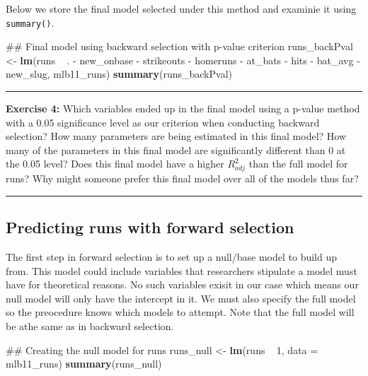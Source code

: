 \documentclass[]{book}
\newenvironment{Shaded}{\begin{snugshade}}{\end{snugshade}}
\newcommand{\KeywordTok}[1]{\textcolor[rgb]{0.13,0.29,0.53}{\textbf{{#1}}}}
\newcommand{\DataTypeTok}[1]{\textcolor[rgb]{0.13,0.29,0.53}{{#1}}}
\newcommand{\DecValTok}[1]{\textcolor[rgb]{0.00,0.00,0.81}{{#1}}}
\newcommand{\StringTok}[1]{\textcolor[rgb]{0.31,0.60,0.02}{{#1}}}
\newcommand{\NormalTok}[1]{{#1}}
\theoremstyle{definition}
\theoremstyle{definition}
\theoremstyle{definition}
\theoremstyle{remark}
\begin{document}
Below we store the final model selected under this method and examinie
it using \texttt{summary()}.

\begin{Shaded}
\begin{Highlighting}[]
\NormalTok{## Final model using backward selection with p-value criterion}
\NormalTok{runs_backPval <-}\StringTok{ }\KeywordTok{lm}\NormalTok{(runs ~}\StringTok{ }\NormalTok{. -}\StringTok{ }\NormalTok{new_onbase -}\StringTok{ }\NormalTok{strikeouts -}\StringTok{ }\NormalTok{homeruns -}\StringTok{ }\NormalTok{at_bats -}\StringTok{ }\NormalTok{hits  -}\StringTok{ }\NormalTok{bat_avg -}\StringTok{ }\NormalTok{new_slug, mlb11_runs)}
\KeywordTok{summary}\NormalTok{(runs_backPval)}
\end{Highlighting}
\end{Shaded}

\begin{center}\rule{0.5\linewidth}{\linethickness}\end{center}

\textbf{Exercise 4:} Which variables ended up in the final model using a
p-value method with a 0.05 significance level as our criterion when
conducting backward selection? How many parameters are being estimated
in this final model? How many of the parameters in this final model are
significantly different than 0 at the 0.05 level? Does this final model
have a higher \(R^2_{adj}\) than the full model for runs? Why might
someone prefer this final model over all of the models thus far?

\begin{center}\rule{0.5\linewidth}{\linethickness}\end{center}

\subsection{Predicting runs with forward
selection}\label{predicting-runs-with-forward-selection}

The first step in forward selection is to set up a null/base model to
build up from. This model could include variables that researchers
stipulate a model must have for theoretical reasons. No such variables
exisit in our case which means our null model will only have the
intercept in it. We must also specify the full model so the preocedure
knows which models to attempt. Note that the full model will be athe
same as in backward selection.

\begin{Shaded}
\begin{Highlighting}[]
\NormalTok{## Creating the null model for runs}
\NormalTok{runs_null <-}\StringTok{ }\KeywordTok{lm}\NormalTok{(runs ~}\StringTok{ }\DecValTok{1}\NormalTok{, }\DataTypeTok{data =} \NormalTok{mlb11_runs)}
\KeywordTok{summary}\NormalTok{(runs_null)}
\end{Highlighting}
\end{Shaded}
\end{document}
